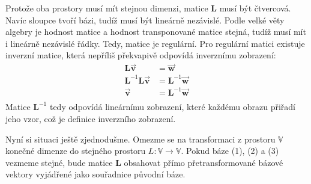 \documentclass[a5paper,12pt]{amsbook}
\theoremstyle{definition}
\newcommand{\mycoord}[1]{\overrightarrow{\mathbf{#1}}}
\newcommand{\mymatrix}[1]{\mathbf{#1}}
\newcommand{\myspace}[1]{\mathbb{#1}}
\newcommand{\mymap}[1]{#1}
\begin{document}
Protože oba prostory musí mít stejnou dimenzi, matice $\mymatrix{L}$ musí být čtvercová.
Navíc sloupce tvoří bázi, tudíž musí být lineárně nezávislé. Podle velké věty algebry
je hodnost matice a hodnost transponované matice stejná, tudíž musí mít i lineárně
nezávislé řádky. Tedy, matice je regulární. Pro regulární matici existuje inverzní matice,
která nepříliš překvapivě odpovídá inverznímu zobrazení:
\begin{align*}
\mymatrix{L}\mycoord{v} &= \mycoord{w} \\
\mymatrix{L}^{-1}\mymatrix{L}\mycoord{v} &= \mymatrix{L}^{-1}\mycoord{w} \\
\mycoord{v} &= \mymatrix{L}^{-1}\mycoord{w} \\
\end{align*}
Matice $\mymatrix{L}^{-1}$ tedy odpovídá lineárnímu zobrazení, které každému obrazu
přiřadí jeho vzor, což je definice inverzního zobrazení.

Nyní si situaci ještě zjednodušme. Omezme se na transformaci z prostoru $\myspace{V}$
konečné dimenze do stejného prostoru $\mymap{L}: \myspace{V}\rightarrow\myspace{V}$.
Pokud báze (1), (2) a (3) vezmeme stejné, bude matice $\mymatrix{L}$ obsahovat přímo
přetransformované bázové vektory vyjádřené jako souřadnice původní báze.
\end{document}
